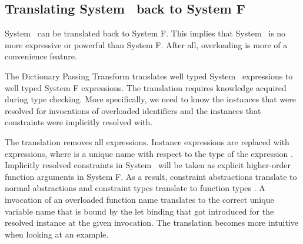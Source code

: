 \subsection{Translating System \Fo\ back to System F}
System \Fo\ can be translated back to System F. 
This implies that System \Fo\ is no more expressive or powerful than System F. 
After all, overloading is more of a convenience feature. 

\noindent The Dictionary Passing Transform translates well typed System \Fo\ expressions to well typed System F expressions. 
The translation requires knowledge acquired during type checking. 
More specifically, we need to know the instances that were resolved for invocations of overloaded identifiers and the instances that constraints were implicitly resolved with.

\noindent The translation removes all \inl{|\Decl|}expressions. 
Instance expressions  are replaced with  expressions, where  is a unique name with respect to the type  of the expression . 
Implicitly resolved constraints in System \Fo\ will be taken as explicit higher-order function arguments in System F.
As a result, constraint abstractions  translate to normal abstractions  and constraint types  translate to function types . 
A invocation of an overloaded function name  translates to the correct unique variable name  that is bound by the let binding that got introduced for the resolved instance at the given invocation. 
The translation becomes more intuitive when looking at an example.

